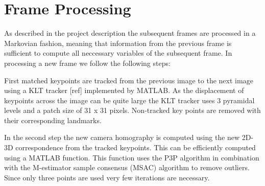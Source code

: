 \section{Frame Processing}
As described in the project description the subsequent frames are processed in a Markovian fashion, meaning that information from the previous frame is sufficient to compute all neccessary variables of the subsequent frame. 
In processing a new frame we follow the following steps: \par
First matched keypoints are tracked from the previous image to the next image using a KLT tracker [ref] implemented by MATLAB. As the displacement of keypoints across the image can be quite large the KLT tracker uses 3 pyramidal levels and a patch size of 31 x 31 pixels. Non-tracked key points are removed with their corresponding landmarks.\par
In the second step the new camera homography is computed using the new 2D-3D correspondence from the tracked keypoints. This can be efficiently computed using a MATLAB function. This function uses the P3P algorithm in combination with the M-estimator sample consensus (MSAC) algorithm to remove outliers. Since only three points are used very few iterations are necessary. 
